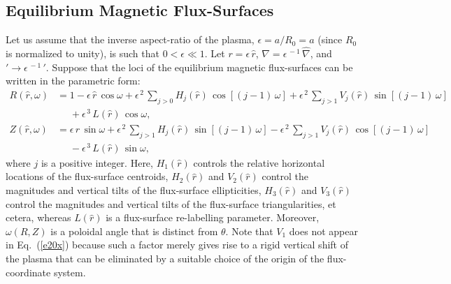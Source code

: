 \documentclass[12pt,prb,aps,notitlepage]{revtex4-1}
\begin{document}
\subsection{Equilibrium Magnetic Flux-Surfaces}\label{flux}
Let us assume that the inverse aspect-ratio of the plasma, $\epsilon=a/R_0=a$ (since $R_0$ is normalized to unity), is such that $0<\epsilon\ll 1$.  
Let $r=\epsilon\,\hat{r}$, $\nabla =\epsilon^{\,-1}\,\hat{\nabla}$, and $'\rightarrow \epsilon^{\,-1}\,'$. 
Suppose that the loci of the equilibrium magnetic flux-surfaces can be written in the parametric form:
\begin{align}
R(\hat{r},\omega) &= 1 -\epsilon\,\hat{r}\,\cos\omega + \epsilon^{\,2}\,\sum_{j>0}H_j(\hat{r})\,\cos[(j-1)\,\omega] + \epsilon^{\,2}\,\sum_{j>1}V_j(\hat{r})\,\sin[(j-1)\,\omega] \nonumber\\[0.5ex]
&\phantom{=}+\epsilon^{\,3}\,L(\hat{r})\,\cos\omega,\label{e19x}\\[0.5ex]
Z(\hat{r},\omega)&= \epsilon\,\hat{r}\,\sin\omega +\epsilon^{\,2}\,\sum_{j>1}H_j(\hat{r})\,\sin[(j-1)\,\omega]
-\epsilon^{\,2}\,\sum_{j>1}V_j(\hat{r})\,\cos[(j-1)\,\omega]\nonumber\\[0.5ex]&\phantom{=}-\epsilon^{\,3}\,L(\hat{r})\,\sin\omega,\label{e20x}
\end{align}
where $j$ is a positive integer. 
Here, $H_1(\hat{r})$  controls the relative horizontal locations of the flux-surface centroids, $H_2(\hat{r})$ and $V_2(\hat{r})$ control the 
magnitudes and vertical tilts of the flux-surface ellipticities, $H_3(\hat{r})$ and
$V_3(\hat{r})$ control the magnitudes and vertical tilts of the flux-surface triangularities, et cetera, whereas $L(\hat{r})$ is a
flux-surface re-labelling parameter. Moreover, $\omega(R,Z)$ is a  poloidal angle that is distinct from $\theta$. Note that $V_1$ does not appear in Eq.~(\ref{e20x})
because such a factor merely gives rise to a rigid vertical shift of the plasma that can be eliminated by a suitable choice of the
origin of the flux-coordinate system.
\end{document}
